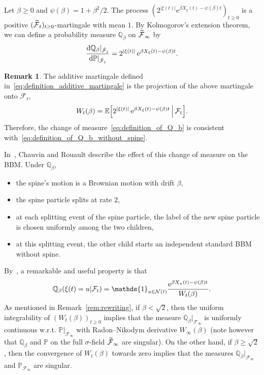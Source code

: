 \documentclass[10pt]{amsart}
\theoremstyle{definition}\newtheorem{defi}[theo]{Definition}\newtheorem{rema}[theo]{Remark}\newtheorem{exam}[theo]{Example}\newtheorem{exem}[theo]{Example}\newtheorem{nota}[theo]{Notation}
\newcommand{\e}{\mathrm{e}}
\renewcommand{\d}[1]{\mathop{}\!\mathrm{d}#1}
\newcommand{\E}{\mathbb{E}}
\renewcommand{\P}{\mathbb{P}}
\newcommand{\Q}{\mathbb{Q}}
\newcommand\1{\mathds{1}}
\newcommand{\cF}{\mathcal{F}}
\newcommand{\cN}{\mathcal{N}}
\let\oldtilde\tilde
\renewcommand*{\tilde}[1]{\mathchoice{\widetilde{#1}}{\widetilde{#1}}{\oldtilde{#1}}{\oldtilde{#1}}}
\let\originalleft\left
\let\originalright\right
\renewcommand{\left}{\mathopen{}\mathclose\bgroup\originalleft}
\renewcommand{\right}{\aftergroup\egroup\originalright}
\begin{document}
Let $\beta \geq 0$ and $\psi(\beta) = 1 + \beta^2/2$. The process $(2^{|\xi(t)|} \e^{\beta X_\xi(t) - \psi(\beta)t})_{t \geq 0}$ is a positive $(\tilde{\cF}_t)_{t \geq 0}$-martingale with mean $1$. By Kolmogorov's extension theorem, we can define a probability measure $\Q_\beta$ on $\tilde{\cF}_\infty$ by
\begin{equation}\label{eq:definition_of_Q_b}
\frac{\d{\Q_\beta|_{\tilde{\cF}_t}}}{\d{\P|_{\tilde{\cF}_t}}} = 2^{|\xi(t)|}\, \e^{\beta X_\xi(t) - \psi(\beta)t}.
\end{equation}

\begin{rema}
The additive martingale defined in~\eqref{eq:definition_additive_martingale} is the projection of the above martingale onto $\cF_t$,
\begin{equation*}
W_t(\beta) = \E \left[2^{|\xi(t)|}\, \e^{\beta X_\xi(t) - \psi(\beta)t} \,\middle|\, \cF_t \right].
\end{equation*}
Therefore, the change of measure~\eqref{eq:definition_of_Q_b} is consistent with~\eqref{eq:definition_of_Q_b_without_spine}.
\end{rema}

\pagebreak{}
In~\cite[Theorem~5]{ChauvinRouault1988}, Chauvin and Rouault describe the effect of this change of measure on the BBM. Under $\Q_\beta$,
\begin{itemize}
\item the spine's motion is a Brownian motion with drift $\beta$,
\item the spine particle splits at rate $2$,
\item at each splitting event of the spine particle, the label of the new spine particle is chosen uniformly among the two children,
\item at this splitting event, the other child starts an independent standard BBM without spine.
\end{itemize}
By~\cite[Theorem~8.1]{HardyHarris2006}, a remarkable and useful property is that
\begin{equation}\label{eq:gibbs_measure_weights}
\Q_{\beta} \left(\xi(t) = u \middle| \cF_t \right) = \1_{u \in \cN(t)} \frac{\e^{\beta X_u(t) - \psi(\beta)t}}{W_t(\beta)}.
\end{equation}
As mentioned in Remark~\ref{rem:rewriting}, if $\beta < \sqrt{2}$, then the uniform integrability of $(W_t(\beta))_{t\geq 0}$ implies that the measure $\Q_\beta|_{\cF_\infty}$ is uniformly continuous w.r.t. $\P|_{\cF_\infty}$ with Radon--Nikodym derivative $W_\infty(\beta)$ (note however that $\Q_\beta$ and $\P$ on the full $\sigma$-field $\tilde{\cF}_\infty$ are singular). On the other hand, if $\beta \geq \sqrt{2}$, then the convergence of $W_t(\beta)$ towards zero implies that the measures $\Q_\beta|_{\cF_\infty}$ and $\P_{\cF_\infty}$ are singular.
\end{document}
